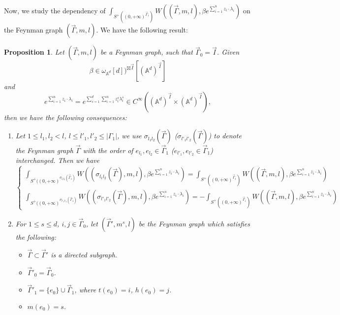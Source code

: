 \documentclass[11pt]{amsart}
\newtheorem{prop}[thm]{Proposition}
\theoremstyle{definition}
\theoremstyle{remark}
\numberwithin{equation}{section}
\begin{document}
Now, we study the dependency of $\int_{S^{+}((0,+\infty)^{\vec{\Gamma}_{1}})}W((\vec{\Gamma},m,l),\beta e^{\sum_{i=1}^{n}z_{i}\cdot\lambda_{i}})$ on the Feynman graph $(\vec{\Gamma},m,l)$. We have the following result:
\begin{prop}\label{well-defineness}
        Let $(\vec{\Gamma},m,l)$ be a Feynman graph, such that $\vec{\Gamma}_{0}=\vec{I}$. Given 
    $$
    \beta\in \omega_{\mathbb{A}^{d}}[d])^{\boxtimes\vec{I}}[(\mathbb{A}^{d})^{\vec{I}}]
    $$
    and
    $$
    e^{\sum_{i=1}^{n}z_{i}\cdot\lambda_{i}}=e^{\sum_{s=1}^{d}\sum_{i=1}^{n}z^{s}_{i}\lambda^{s}_{i}}\in C^{\infty}((\mathbb{A}^{d})^{\vec{I}}\times (\mathbb{A}^{d})^{\vec{I}}),
    $$
    then we have the following consequences:
    \begin{enumerate}
        \item Let $1\leq l_{1},l_{2}< l$, $l\leq l'_{1},l'_{2}\leq |\Gamma_{1}|$, we use $\sigma_{l_{1}l_{2}}(\vec{\Gamma})$ ($\sigma_{l'_{1}l'_{2}}(\vec{\Gamma})$) to denote the Feynman graph $\vec{\Gamma}$ with the order of $e_{l_{1}},e_{l_{2}}\in\vec{\Gamma}_{1}$ ($e_{l'_{1}},e_{l'_{2}}\in\vec{\Gamma}_{1}$) interchanged. Then we have
        $$
        \begin{cases}
            \int_{S^{+}((0,+\infty)^{\sigma_{l_{1}l_{2}}(\vec{\Gamma}_{1})}}W((\sigma_{l_{1}l_{2}}(\vec{\Gamma}),m,l),\beta e^{\sum_{i=1}^{n}z_{i}\cdot\lambda_{i}})=
        \int_{S^{+}((0,+\infty)^{\vec{\Gamma}_{1}})}W((\vec{\Gamma},m,l),\beta e^{\sum_{i=1}^{n}z_{i}\cdot\lambda_{i}})\\
        \int_{S^{+}((0,+\infty)^{\sigma_{l'_{1}l'_{2}}(\vec{\Gamma}_{1})}}W((\sigma_{l'_{1}l'_{2}}(\vec{\Gamma}),m,l),\beta e^{\sum_{i=1}^{n}z_{i}\cdot\lambda_{i}})=
        -\int_{S^{+}((0,+\infty)^{\vec{\Gamma}_{1}})}W((\vec{\Gamma},m,l),\beta e^{\sum_{i=1}^{n}z_{i}\cdot\lambda_{i}})
        \end{cases}
        $$
        \item For $1\leq s\leq d$, $i,j\in \vec{\Gamma}_{0}$, let $(\vec{\Gamma}',m^{s},l)$ be the Feynman graph which satisfies the following:
        \begin{itemize}
            \item $\vec{\Gamma}\subset\vec{\Gamma}'$ is a directed subgraph.
            \item $\vec{\Gamma}'_{0}=\vec{\Gamma}_{0}$.
            \item $\vec{\Gamma}'_{1}=\{e_{0}\}\cup\vec{\Gamma}_{1}$, where $t(e_{0})=i$, $h(e_{0})=j$.
            \item $m(e_{0})=s$.

\end{itemize}
\end{enumerate}
\end{prop}
\end{document}

